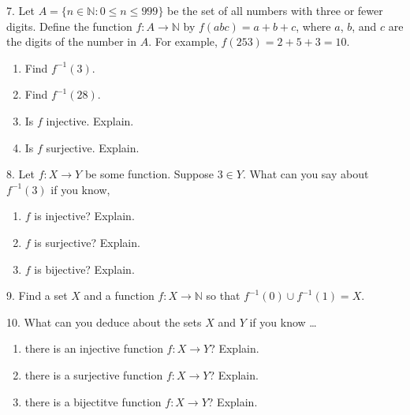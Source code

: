 \documentclass[10pt,]{book}
\theoremstyle{plain}
\theoremstyle{definition}
\numberwithin{equation}{chapter}
\def\N{\mathbb N}
\def\inv{^{-1}}
\def\st{:}
\begin{document}
\begin{exerciselist}
\par\smallskip
\item[7.]\hypertarget{exercise-33}{}
            Let \(A = \{n \in \N \st 0 \le n \le 999\}\) be the set of all numbers with three or fewer digits. Define the function \(f:A \to \N\) by \(f(abc) = a+b+c\), where \(a\), \(b\), and \(c\) are the digits of the number in \(A\). For example, \(f(253) = 2 + 5 + 3 =  10\).
          \leavevmode%
\begin{enumerate}[label=(\alph*)]
\item\hypertarget{li-151}{}
                Find \(f\inv(3)\).
\item\hypertarget{li-152}{}
                Find \(f\inv(28)\).
\item\hypertarget{li-153}{}
                Is \(f\) injective. Explain.
\item\hypertarget{li-154}{}
                Is \(f\) surjective. Explain.
\end{enumerate}

\par\smallskip
\item[8.]\hypertarget{exercise-34}{}
            Let \(f:X \to Y\) be some function. Suppose \(3 \in Y\). What can you say about \(f\inv(3)\) if you know,
          \leavevmode%
\begin{enumerate}[label=(\alph*)]
\item\hypertarget{li-159}{}\(f\) is injective? Explain.%
\item\hypertarget{li-160}{}\(f\) is surjective? Explain.%
\item\hypertarget{li-161}{}\(f\) is bijective? Explain.%
\end{enumerate}

\par\smallskip
\item[9.]\hypertarget{exercise-35}{}
            Find a set \(X\) and a function \(f:X \to \N\) so that \(f\inv(0) \cup f\inv(1) = X\).
\par\smallskip
\item[10.]\hypertarget{exercise-36}{}
            What can you deduce about the sets \(X\) and \(Y\) if you know
            \dots{}
          \leavevmode%
\begin{enumerate}[label=(\alph*)]
\item\hypertarget{li-165}{}
                there is an injective function \(f:X \to Y\)? Explain.
\item\hypertarget{li-166}{}
                there is a surjective function \(f:X \to Y\)? Explain.
\item\hypertarget{li-167}{}
                there is a bijectitve function \(f:X \to Y\)? Explain.
\end{enumerate}


\end{exerciselist}
\end{document}
